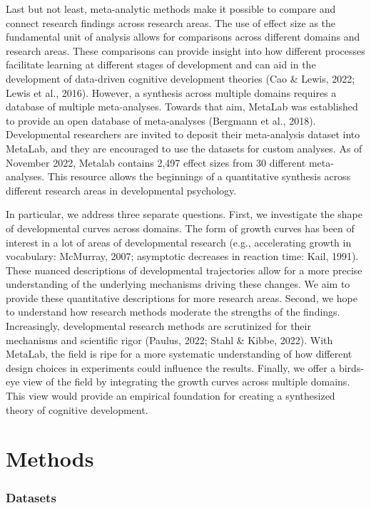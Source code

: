 \documentclass[10pt, letterpaper]{article}
\begin{document}
Last but not least, meta-analytic methods make it possible to compare
and connect research findings across research areas. The use of effect
size as the fundamental unit of analysis allows for comparisons across
different domains and research areas. These comparisons can provide
insight into how different processes facilitate learning at different
stages of development and can aid in the development of data-driven
cognitive development theories (Cao \& Lewis, 2022; Lewis et al., 2016).
However, a synthesis across multiple domains requires a database of
multiple meta-analyses. Towards that aim, MetaLab was established to
provide an open database of meta-analyses (Bergmann et al., 2018).
Developmental researchers are invited to deposit their meta-analysis
dataset into MetaLab, and they are encouraged to use the datasets for
custom analyses. As of November 2022, Metalab contains 2,497 effect
sizes from 30 different meta-analyses. This resource allows the
beginnings of a quantitative synthesis across different research areas
in developmental psychology.

In particular, we address three separate questions. First, we
investigate the shape of developmental curves across domains. The form
of growth curves has been of interest in a lot of areas of developmental
research (e.g., accelerating growth in vocabulary: McMurray, 2007;
asymptotic decreases in reaction time: Kail, 1991). These nuanced
descriptions of developmental trajectories allow for a more precise
understanding of the underlying mechanisms driving these changes. We aim
to provide these quantitative descriptions for more research areas.
Second, we hope to understand how research methods moderate the
strengths of the findings. Increasingly, developmental research methods
are scrutinized for their mechanisms and scientific rigor (Paulus, 2022;
Stahl \& Kibbe, 2022). With MetaLab, the field is ripe for a more
systematic understanding of how different design choices in experiments
could influence the results. Finally, we offer a birds-eye view of the
field by integrating the growth curves across multiple domains. This
view would provide an empirical foundation for creating a synthesized
theory of cognitive development.

\hypertarget{methods}{%
\section{Methods}\label{methods}}

\hypertarget{datasets}{%
\subsubsection{Datasets}\label{datasets}}
\end{document}
